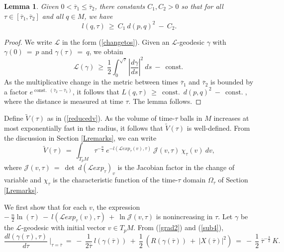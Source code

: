 \documentclass[12pt]{amsart}
\newcommand{\const}{\operatorname{const.}}
\numberwithin{equation}{section}
\theoremstyle{plain}
\newtheorem{lemma}[equation]{Lemma}
\theoremstyle{definition}
\theoremstyle{remark}
\begin{document}
\begin{lemma} \label{lowerbound}
Given $0 < \overline{\tau}_1 \le \overline{\tau}_2$,
there constants $C_1, C_2 > 0$ so that for all $\tau \in 
[\overline{\tau}_1, \overline{\tau}_2]$ and all
$q \in M$, we have
\begin{equation} \label{lbound}
l(q, \tau) \: \ge \:
C_1 \: d(p,q)^2 \: 
- \: C_2.
\end{equation}
\end{lemma}
\begin{proof}
We write ${\mathcal L}$ in the form (\ref{changetos}).
Given an ${\mathcal L}$-geodesic $\gamma$ with
$\gamma(0) \: = \: p$ and $\gamma({\tau}) \: = \: q$, we obtain
\begin{equation}
{\mathcal L}(\gamma) \: \ge \:
\frac12 \int_0^{\sqrt{\tau}} \left| \frac{d\gamma}{ds} \right|^2 \: ds \:
- \: \const
\end{equation}
As the multiplicative change in the metric between times
$\overline{\tau}_1$ and $\overline{\tau}_2$ is bounded by a factor
$e^{\const \: (\overline{\tau}_2 - \overline{\tau}_1)}$, it follows that
$L(q, \tau) \: \ge \:
\const \: d(p,q)^2 \:
- \: \const$, where the distance is measured at time $\tau$.
The lemma follows.
\end{proof}

Define 
$\tilde{V}(\tau)$
as in (\ref{reducedv}).
As the volume of time-$\tau$ balls in $M$ increases at most
exponentially fast in the radius, it follows that
$\tilde{V}(\tau)$ is well-defined.
From the discussion in Section \ref{Lremarks}, we can write
\begin{equation}
\tilde{V}(\tau) \: = \: \int_{T_pM} \tau^{-\frac{n}{2}} \: 
e^{-l({\mathcal L}exp_\tau(v),\tau)} \: {\mathcal J}(v, \tau) \: 
\chi_{\tau}(v) \:
dv,
\end{equation} 
where ${\mathcal J}(v, \tau) \: = \:
\det \: d\left( {\mathcal L}exp_\tau \right)_v$ is the Jacobian factor
in the change of variable and 
$\chi_\tau$ is the characteristic function of the
time-$\tau$ domain $\Omega_\tau$ of Section \ref{Lremarks}. 

We first show
that for each $v$, the expression
$- \: \frac{n}{2} \ln(\tau) \: 
- \: l({\mathcal L}exp_\tau(v), \tau) \: + \: \ln {\mathcal J}(v, \tau)$ is
nonincreasing in $\tau$. Let $\gamma$ be the ${\mathcal L}$-geodesic
with initial vector $v \in T_pM$.
From (\ref{grad2}) and (\ref{sub4}),
\begin{equation} \label{bbound1}
\frac{dl(\gamma(\tau), \tau)}{d\tau} \: \Big|_{\tau = \overline{\tau}} \: = \:
- \: \frac{1}{2\overline{\tau}} \: l(\gamma(\overline{\tau})) \: + \:
\frac12 \: \left( R(\gamma(\overline{\tau})) \: + \:
|X(\overline{\tau})|^2 \right) \: =\:
- \: \frac12 \: \overline{\tau}^{-\frac32} \: K.
\end{equation}
\end{document}

